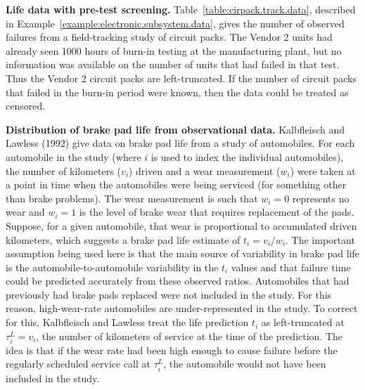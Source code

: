 \begin{example}
\label{example:pretest.and.left.trun}
{\bf Life data with pre-test screening.}
Table~\ref{table:cirpack.track.data}, described in
Example~\ref{example:electronic.subsystem.data}, gives the number of
observed failures from a field-tracking study of circuit packs.  The
Vendor 2 units had already seen 1000 hours of burn-in testing at the
manufacturing plant, but no information was available on the number of
units that had failed in that test. Thus the Vendor 2 circuit packs
are left-truncated.
If the number of circuit packs that failed in the burn-in period
were known, then the data could be treated as censored.
\end{example}

\begin{example}
\label{example:brake.pad.trun}
{\bf Distribution of brake pad life from observational data.}
Kalbfleisch and Lawless (1992) give data on brake pad life from a
study of automobiles. For each automobile in the study (where $i$ is
used to index the individual automobiles), the number of kilometers
($v_{i}$) driven and a wear measurement ($w_{i}$) were taken at a
point in time when the automobiles were being serviced (for
something other than brake problems). The wear measurement is such
that $w_{i}=0$ represents no wear and $w_{i}=1$ is the level of
brake wear that requires replacement of the pads. Suppose, for a
given automobile, that wear is proportional to accumulated driven
kilometers, which suggests a brake pad life estimate of
$t_{i}=v_{i}/w_{i}$.  The important assumption being used here is
that the main source of variability in brake pad life is the
automobile-to-automobile variability in the $t_{i}$ values and that
failure time could be predicted accurately from these observed
ratios. Automobiles that had previously had brake pads replaced were
not included in the study. For this reason, high-wear-rate
automobiles are under-represented in the study. To correct for this,
Kalbfleisch and Lawless treat the life prediction $t_{i}$ as
left-truncated at $\tau^{L}_{i}=v_{i}$, the number of kilometers of
service at the time of the prediction. The idea is that if the wear
rate had been high enough to cause failure before the regularly
scheduled service call at $\tau_{i}^{L}$, the automobile would not
have been included in the study.
\end{example}



